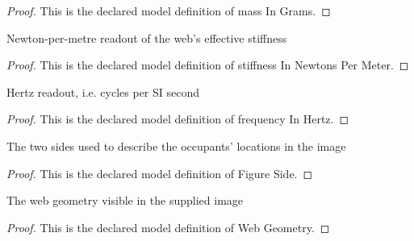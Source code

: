 \begin{proof}
  This is the declared model definition of mass In Grams.
\end{proof}
\begin{definition}
  \label{def:physics:phyx-mini-0200:phyxminiproblems-problemphyxmini0200-stiffnessinnewtonspermeter}
  Newton-per-metre readout of the web's effective stiffness
\end{definition}
\begin{proof}
  This is the declared model definition of stiffness In Newtons Per Meter.
\end{proof}
\begin{definition}
  \label{def:physics:phyx-mini-0200:phyxminiproblems-problemphyxmini0200-frequencyinhertz}
  Hertz readout, i.e. cycles per SI second
\end{definition}
\begin{proof}
  This is the declared model definition of frequency In Hertz.
\end{proof}
\begin{definition}
  \label{def:physics:phyx-mini-0200:phyxminiproblems-problemphyxmini0200-figureside}
  The two sides used to describe the occupants' locations in the image
\end{definition}
\begin{proof}
  This is the declared model definition of Figure Side.
\end{proof}
\begin{definition}
  \label{def:physics:phyx-mini-0200:phyxminiproblems-problemphyxmini0200-webgeometry}
  The web geometry visible in the supplied image
\end{definition}
\begin{proof}
  This is the declared model definition of Web Geometry.
\end{proof}
